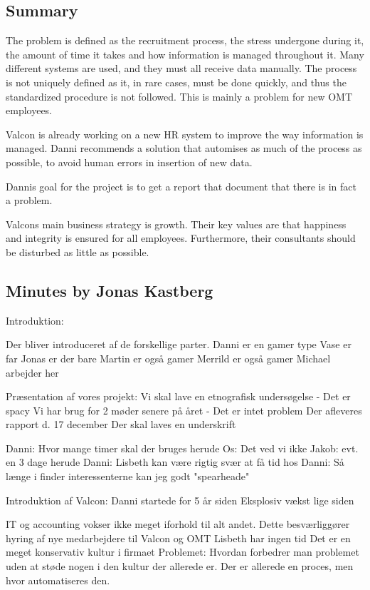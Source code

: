 \label{app:danni_initiation}

\subsection{Summary}

The problem is defined as the recruitment process, the stress undergone during it, the amount of time it takes and how information is managed throughout it. Many different systems are used, and they must all receive data manually.
The process is not uniquely defined as it, in rare cases, must be done quickly, and thus the standardized procedure is not followed. This is mainly a problem for new OMT employees.

Valcon is already working on a new HR system to improve the way information is managed. Danni recommends a solution that automises as much of the process as possible, to avoid human errors in insertion of new data.

Dannis goal for the project is to get a report that document that there is in fact a problem.

Valcons main business strategy is growth.
Their key values are that happiness and integrity is ensured for all employees. Furthermore, their consultants should be disturbed as little as possible.

\subsection{Minutes by Jonas Kastberg}
Introduktion:

Der bliver introduceret af de forskellige parter.
Danni er en gamer type
Vase er far
Jonas er der bare
Martin er også gamer
Merrild er også gamer
Michael arbejder her

Præsentation af vores projekt:
Vi skal lave en etnografisk undersøgelse
	- Det er spacy
Vi har brug for 2 møder senere på året
	- Det er intet problem
Der afleveres rapport d. 17 december
Der skal laves en underskrift



Danni: Hvor mange timer skal der bruges herude
Os: Det ved vi ikke
Jakob: evt. en 3 dage herude
Danni: Lisbeth kan være rigtig svær at få tid hos
Danni: Så længe i finder interessenterne kan jeg godt "spearheade"


Introduktion af Valcon:
Danni startede for 5 år siden
Eksplosiv vækst lige siden

IT og accounting vokser ikke meget iforhold til alt andet.
Dette besværliggører hyring af nye medarbejdere til Valcon og OMT
Lisbeth har ingen tid
Det er en meget konservativ kultur i firmaet
Problemet: Hvordan forbedrer man problemet uden at støde nogen i den kultur der allerede er.
Der er allerede en proces, men hvor automatiseres den.

